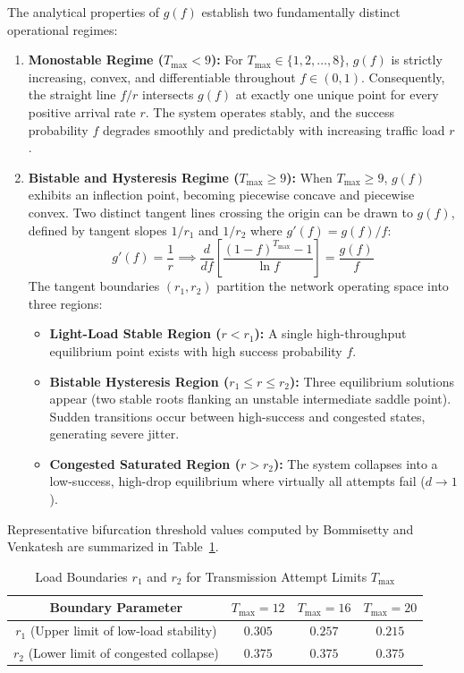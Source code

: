 The analytical properties of $g(f)$ establish two fundamentally distinct operational regimes:
\begin{enumerate}
    \item \textbf{Monostable Regime ($T_{\max} < 9$):} For $T_{\max} \in \{1, 2, \dots, 8\}$, $g(f)$ is strictly increasing, convex, and differentiable throughout $f \in (0, 1)$. Consequently, the straight line $f/r$ intersects $g(f)$ at exactly one unique point for every positive arrival rate $r$. The system operates stably, and the success probability $f$ degrades smoothly and predictably with increasing traffic load $r$.
    \item \textbf{Bistable and Hysteresis Regime ($T_{\max} \ge 9$):} When $T_{\max} \ge 9$, $g(f)$ exhibits an inflection point, becoming piecewise concave and piecewise convex. Two distinct tangent lines crossing the origin can be drawn to $g(f)$, defined by tangent slopes $1/r_1$ and $1/r_2$ where $g'(f) = g(f)/f$:
    \begin{equation}
        \label{eq:tangent_boundaries}
        g'(f) = \frac{1}{r} \implies \frac{d}{df}\left[ \frac{(1 - f)^{T_{\max}} - 1}{\ln f} \right] = \frac{g(f)}{f}
    \end{equation}
    The tangent boundaries $(r_1, r_2)$ partition the network operating space into three regions:
    \begin{itemize}
        \item \textbf{Light-Load Stable Region ($r < r_1$):} A single high-throughput equilibrium point exists with high success probability $f$.
        \item \textbf{Bistable Hysteresis Region ($r_1 \le r \le r_2$):} Three equilibrium solutions appear (two stable roots flanking an unstable intermediate saddle point). Sudden transitions occur between high-success and congested states, generating severe jitter.
        \item \textbf{Congested Saturated Region ($r > r_2$):} The system collapses into a low-success, high-drop equilibrium where virtually all attempts fail ($d \to 1$).
    \end{itemize}
\end{enumerate}

Representative bifurcation threshold values computed by Bommisetty and Venkatesh \cite{bommisetty2023connection} are summarized in Table~\ref{tab:load_boundaries}.

\begin{table}[htbp]
\centering
\caption{Load Boundaries $r_1$ and $r_2$ for Transmission Attempt Limits $T_{\max}$ \cite{bommisetty2023connection}}
\label{tab:load_boundaries}
\begin{tabular}{cccc}
\toprule
\textbf{Boundary Parameter} & $T_{\max} = 12$ & $T_{\max} = 16$ & $T_{\max} = 20$ \\
\midrule
$r_1$ (Upper limit of low-load stability) & $0.305$ & $0.257$ & $0.215$ \\
$r_2$ (Lower limit of congested collapse) & $0.375$ & $0.375$ & $0.375$ \\
\bottomrule
\end{tabular}
\end{table}

